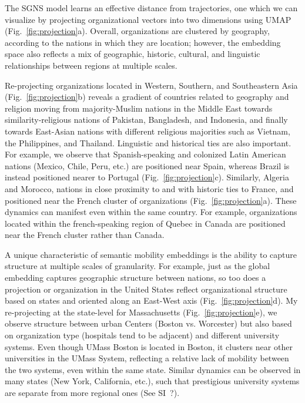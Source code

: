 \documentclass[12pt]{article} %
\begin{document}
The SGNS model learns an effective distance from trajectories, one which we can visualize by projecting organizational vectors into two dimensions using UMAP \autocite{mcinnes2018umap} (Fig.~\ref{fig:projection}a).
Overall, organizations are clustered by geography, according to the nations in which they are location;
however, the embedding space also reflects a mix of geographic, historic, cultural, and linguistic relationships between regions at multiple scales.

Re-projecting organizations located in Western, Southern, and Southeastern Asia (Fig.~\ref{fig:projection}b) reveals a gradient of countries related to geography and religion moving from majority-Muslim nations in the Middle East towards similarity-religious nations of Pakistan, Bangladesh, and Indonesia, and finally towards East-Asian nations with different religious majorities such as Vietnam, the Philippines, and Thailand.
Linguistic and historical ties are also important.
For example, we observe that Spanish-speaking and colonized Latin American nations (Mexico, Chile, Peru, etc.) are positioned near Spain, whereas Brazil is instead positioned nearer to Portugal (Fig.~\ref{fig:projection}c).
Similarly, Algeria and Morocco, nations in close proximity to and with historic ties to France, and positioned near the French cluster of organizations (Fig.~\ref{fig:projection}a).
These dynamics can manifest even within the same country.
For example, organizations located within the french-speaking region of Quebec in Canada are positioned near the French cluster rather than Canada.

A unique characteristic of semantic mobility embeddings is the ability to capture structure at multiple scales of granularity.
For example, just as the global embedding captures geographic structure between nations, so too does a projection or organization in the United States reflect organizational structure based on states and oriented along an East-West axis (Fig.~\ref{fig:projection}d).
My re-projecting at the state-level for Massachusetts (Fig.~\ref{fig:projection}e), we observe structure between urban Centers (Boston vs. Worcester) but also based on organization type (hospitals tend to be adjacent) and different university systems. Even though UMass Boston is located in Boston, it clusters near other universities in the UMass System, reflecting a relative lack of mobility between the two systems, even within the same state.
Similar dynamics can be observed in many states (New York, California, etc.), such that prestigious university systems are separate from more regional ones (See SI~?).
\end{document}
